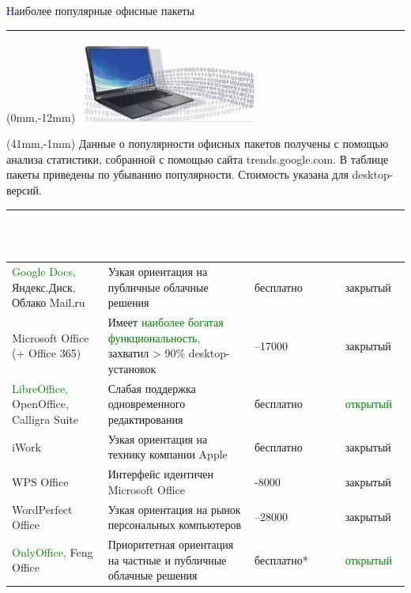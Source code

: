 \documentclass[9pt]{beamer}
\begin{document}
	\begin{frame}
	\begin{flushright}
	\vspace{1em}
		\large{\textcolor{blue}{Н}аиболее популярные офисные пакеты}
		\\ \rule{10cm}{0.4pt}
	\end{flushright}
	\begin{textblock*}{0mm}(0mm,-12mm)
		\includegraphics[scale=0.7]{balakshin.png}
	\end{textblock*}
	\begin{textblock*}{90mm}(41mm,-1mm)
	\scriptsize{Данные о популярности офисных пакетов получены с помощью анализа статистики,
собранной с помощью сайта trends.google.com. В таблице пакеты приведены по
убыванию популярности. Стоимость указана для desktop-версий.}
	\end{textblock*}
	\vspace{1em}
	\small{
	\begin{table}\centering
	\begin{tabular}{|>{\centering\arraybackslash}p{43mm}|>{\centering\arraybackslash}p{40mm}|>{\centering\arraybackslash}p{15mm}|>{\centering\arraybackslash}p{13mm}|}
	\hline
	 \rowcolor{black} 
	\textcolor{white}{\textbf{Название офисного пакета}} & \textcolor{white}					{\textbf{Особенности}} &\textcolor{white}{Примерная стоимость на 2020 год, руб.} & \textcolor{white}		{\textbf{Исходный код}} \\
	\hline
	\textcolor{green}{Google Docs,} Яндекс.Диск, Облако Mail.ru & Узкая ориентация на публичные облачные решения & бесплатно & закрытый \\ \hline
Microsoft Office (+ Office
365) &
Имеет \textcolor{green}{наиболее богатая функциональность,}
захватил > 90\% desktop-установок & 5000–17000& закрытый\\ \hline
\textcolor{green}{LibreOffice,} OpenOffice,
Calligra Suite &
Слабая поддержка одновременного
редактирования&
бесплатно &\textcolor{green}{открытый}\\ \hline
iWork& Узкая ориентация на технику
компании Apple& бесплатно &закрытый\\ \hline
WPS Office &Интерфейс идентичен Microsoft Office &3000-8000& закрытый\\ \hline
WordPerfect Office &Узкая ориентация на рынок персональных
компьютеров&
7000–28000 &закрытый\\ \hline
\textcolor{green}{OnlyOffice,} Feng Office &Приоритетная ориентация на частные и
публичные облачные решения& бесплатно*& \textcolor{green}{открытый}\\ \hline
	\end{tabular}
	\end{table}
	}
	\end{frame}
\end{document}

